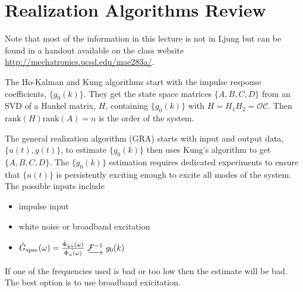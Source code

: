 \mainmatter%
\setcounter{page}{1}

\lectureseries[\course]{\course}

\date{October 29, 2009}

\setaddress%

\setcounter{lecture}{10}
\setcounter{chapter}{10}


\section{Realization Algorithms Review}
Note that most of the information in this lecture is not in Ljung but can be found in a handout available on the class website \\ \href{http://mechatronics.ucsd.edu/mae283a/}{http://mechatronics.ucsd.edu/mae283a/}.

The Ho-Kalman and Kung algorithms start with the impulse response coefficients, $\{g_0(k)\}$.
They get the state space matrices $\{A,B,C,D\}$ from an SVD of a Hankel matrix, $H$, containing $\{g_0(k)\}$ with $H=H_1H_2=\mathcal{OC}$.
Then $\text{rank}(H)\text{rank}(A)=n$ is the order of the system.

The general realization algorithm (GRA) starts with input and output data, $\{u(t),y(t)\}$, to estimate $\{g_0(k)\}$ then uses Kung's algorithm to get $\{A,B,C,D\}$.
The $\{g_0(k)\}$ estimation requires dedicated experiments to ensure that $\{u(t)\}$ is persistently exciting enough to excite all modes of the system.
The possible inputs include
\begin{itemize}
\item impulse input
\item white noise or broadband excitation
\item $\hat{G}_{\text{spec}}(\omega) = \frac{\hat{\Phi}_{yu}(\omega)}{\hat{\Phi_u(\omega)}}~\underrightarrow{\mathcal{F}^{-1}}~g_0(k)$
\end{itemize}
If one of the frequencies used is bad or too low then the estimate will be bad.
The best option is to use broadband exicitation.

